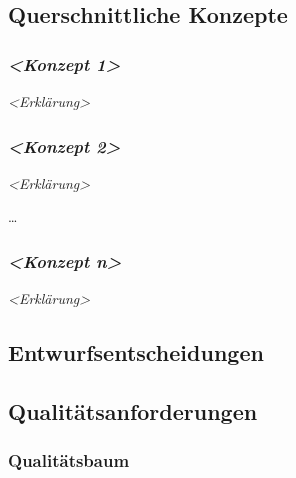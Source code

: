 

\subsection{Querschnittliche Konzepte}\label{section-concepts}

\subsubsection{\texorpdfstring{\emph{\textless{}Konzept
1\textgreater{}}}{\textless{}Konzept 1\textgreater{}}}\label{__emphasis_konzept_1_emphasis}

\emph{\textless{}Erklärung\textgreater{}}

\subsubsection{\texorpdfstring{\emph{\textless{}Konzept
2\textgreater{}}}{\textless{}Konzept 2\textgreater{}}}\label{__emphasis_konzept_2_emphasis}

\emph{\textless{}Erklärung\textgreater{}}

\ldots{}

\subsubsection{\texorpdfstring{\emph{\textless{}Konzept
n\textgreater{}}}{\textless{}Konzept n\textgreater{}}}\label{__emphasis_konzept_n_emphasis}

\emph{\textless{}Erklärung\textgreater{}}

\subsection{Entwurfsentscheidungen}\label{section-design-decisions}

\subsection{Qualitätsanforderungen}\label{section-quality-scenarios}

\subsubsection{Qualitätsbaum}\label{_qualit_tsbaum}

